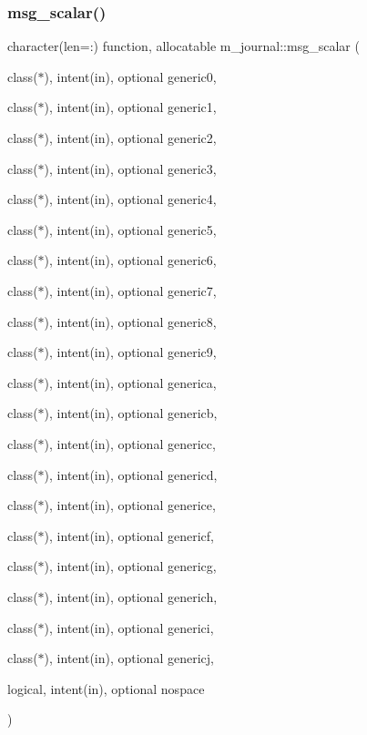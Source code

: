 \subsubsection{\texorpdfstring{msg\+\_\+scalar()}{msg\_scalar()}}
{\footnotesize\ttfamily character(len=\+:) function, allocatable m\+\_\+journal\+::msg\+\_\+scalar (\begin{DoxyParamCaption}\item[{class($\ast$), intent(in), optional}]{generic0,  }\item[{class($\ast$), intent(in), optional}]{generic1,  }\item[{class($\ast$), intent(in), optional}]{generic2,  }\item[{class($\ast$), intent(in), optional}]{generic3,  }\item[{class($\ast$), intent(in), optional}]{generic4,  }\item[{class($\ast$), intent(in), optional}]{generic5,  }\item[{class($\ast$), intent(in), optional}]{generic6,  }\item[{class($\ast$), intent(in), optional}]{generic7,  }\item[{class($\ast$), intent(in), optional}]{generic8,  }\item[{class($\ast$), intent(in), optional}]{generic9,  }\item[{class($\ast$), intent(in), optional}]{generica,  }\item[{class($\ast$), intent(in), optional}]{genericb,  }\item[{class($\ast$), intent(in), optional}]{genericc,  }\item[{class($\ast$), intent(in), optional}]{genericd,  }\item[{class($\ast$), intent(in), optional}]{generice,  }\item[{class($\ast$), intent(in), optional}]{genericf,  }\item[{class($\ast$), intent(in), optional}]{genericg,  }\item[{class($\ast$), intent(in), optional}]{generich,  }\item[{class($\ast$), intent(in), optional}]{generici,  }\item[{class($\ast$), intent(in), optional}]{genericj,  }\item[{logical, intent(in), optional}]{nospace }\end{DoxyParamCaption})\hspace{0.3cm}{\ttfamily [private]}}



